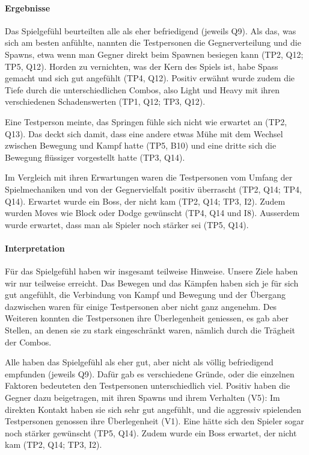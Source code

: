 \documentclass[../Main.tex]{subfiles}
\begin{document}
\paragraph{Ergebnisse}
Das Spielgefühl beurteilten alle als eher befriedigend (jeweils Q9). Als das, was sich am besten anfühlte, nannten die Testpersonen die Gegnerverteilung und die Spawns, etwa wenn man Gegner direkt beim Spawnen besiegen kann (TP2, Q12; TP5, Q12). Horden zu vernichten, was der Kern des Spiels ist, habe Spass gemacht und sich gut angefühlt (TP4, Q12). Positiv erwähnt wurde zudem die Tiefe durch die unterschiedlichen Combos, also Light und Heavy mit ihren verschiedenen Schadenswerten (TP1, Q12; TP3, Q12).

Eine Testperson meinte, das Springen fühle sich nicht wie erwartet an (TP2, Q13). Das deckt sich damit, dass eine andere etwas Mühe mit dem Wechsel zwischen Bewegung und Kampf hatte (TP5, B10) und eine dritte sich die Bewegung flüssiger vorgestellt hatte (TP3, Q14).

Im Vergleich mit ihren Erwartungen waren die Testpersonen vom Umfang der Spielmechaniken und von der Gegnervielfalt positiv überrascht (TP2, Q14; TP4, Q14). Erwartet wurde ein Boss, der nicht kam (TP2, Q14; TP3, I2). Zudem wurden Moves wie Block oder Dodge gewünscht (TP4, Q14 und I8). Ausserdem wurde erwartet, dass man als Spieler noch stärker sei (TP5, Q14).

\paragraph{Interpretation}
Für das Spielgefühl haben wir insgesamt teilweise Hinweise. Unsere Ziele haben wir nur teilweise erreicht. Das Bewegen und das Kämpfen haben sich je für sich gut angefühlt, die Verbindung von Kampf und Bewegung und der Übergang dazwischen waren für einige Testpersonen aber nicht ganz angenehm. Des Weiteren konnten die Testpersonen ihre Überlegenheit geniessen, es gab aber Stellen, an denen sie zu stark eingeschränkt waren, nämlich durch die Trägheit der Combos.

Alle haben das Spielgefühl als eher gut, aber nicht als völlig befriedigend empfunden (jeweils Q9). Dafür gab es verschiedene Gründe, oder die einzelnen Faktoren bedeuteten den Testpersonen unterschiedlich viel. Positiv haben die Gegner dazu beigetragen, mit ihren Spawns und ihrem Verhalten (V5): Im direkten Kontakt haben sie sich sehr gut angefühlt, und die aggressiv spielenden Testpersonen genossen ihre Überlegenheit (V1). Eine hätte sich den Spieler sogar noch stärker gewünscht (TP5, Q14). Zudem wurde ein Boss erwartet, der nicht kam (TP2, Q14; TP3, I2).
\end{document}
